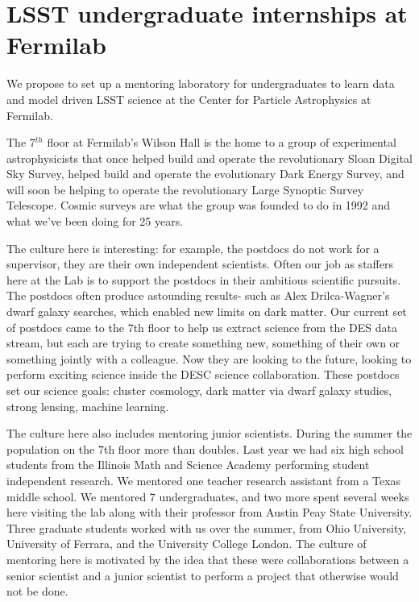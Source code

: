 
\section{LSST undergraduate internships at Fermilab}


 
We propose to set up a mentoring laboratory for undergraduates to
learn data and model driven LSST science at the Center for Particle
Astrophysics at Fermilab.

The 7$^{th}$ floor at Fermilab's Wilson Hall is the home to a 
group of experimental astrophysicists that once helped build and operate
the revolutionary Sloan Digital Sky Survey, helped build and operate
the evolutionary Dark Energy Survey, and will soon be helping to operate 
the revolutionary Large Synoptic Survey Telescope. Cosmic surveys are
what the group was founded to do in 1992 and what we've been doing for 25 years.

The culture here is interesting: for example, the postdocs do not work for
a supervisor, they are their own independent scientists. Often our job as 
staffers here at the Lab is to support the postdocs in their 
ambitious scientific pursuits. The postdocs 
often produce astounding results- such as Alex Drilca-Wagner's dwarf galaxy searches,
which  enabled new limits on dark matter. Our current set of postdocs 
came to the 7th floor to help us extract science from the DES data stream,
but each are trying to create something new, something of their own or 
something jointly with a colleague. Now they are looking to the future,
looking to perform exciting science  inside the DESC science collaboration.
These postdocs set our science goals: cluster cosmology, dark matter via
dwarf galaxy studies, strong lensing, machine learning.

The culture here also includes mentoring junior scientists.
During the summer the population on the 7th floor more than doubles.
Last year we had six high school students from the Illinois Math
and Science Academy performing student independent research.
We mentored one teacher research assistant from a Texas middle school. 
We mentored 7 undergraduates, and two more
spent several weeks here visiting the lab along with their professor from
Austin Peay State University.  Three graduate students worked with us over the summer,
from Ohio University, University of Ferrara, and the University College London.
The culture of mentoring here is motivated by the idea that these were
collaborations between a  senior scientist and a junior scientist to 
perform a project that otherwise would not be done.

